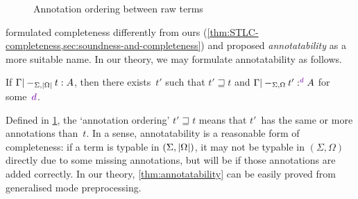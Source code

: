 \begin{figure}
  \centering\small
  
  \caption{Annotation ordering between raw terms}
  \label{fig:annotation-ordering}
\end{figure}

\citet{Dunfield2021} formulated completeness differently from ours (\cref{thm:STLC-completeness,sec:soundness-and-completeness}) and proposed \emph{annotatability} as a more suitable name.
In our theory, we may formulate annotatability as follows.

\begin{proposition}[Annotatability]\label{thm:annotatability}
If\/ $\Gamma |-_{\Sigma,\left|\Omega\right|} t : A$, then there exists~$t'$ such that\/ $t' \sqsupseteq t$ and $\Gamma |-_{\Sigma,\Omega} t' :^\dir{d} A$ for some~$\dir{d}$.
\end{proposition}

Defined in \cref{fig:annotation-ordering}, the `annotation ordering' $t' \sqsupseteq t$ means that $t'$~has the same or more annotations than~$t$.
In a sense, annotatability is a reasonable form of completeness: if a term is typable in $(\Sigma, \left|\Omega\right|)$, it may not be typable in $(\Sigma, \Omega)$ directly due to some missing annotations, but will be if those annotations are added correctly.
In our theory, \cref{thm:annotatability} can be easily proved from generalised mode preprocessing.

